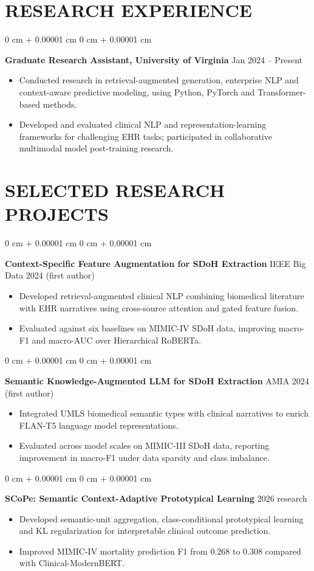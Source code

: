 \documentclass[10pt, letterpaper]{article}
\newenvironment{highlights}{
    \begin{itemize}[
        topsep=0.03 cm,
        parsep=0.03 cm,
        partopsep=0pt,
        itemsep=0pt,
        leftmargin=0 cm + 10pt
    ]
}{
    \end{itemize}
} %
\newenvironment{onecolentry}{
    \begin{adjustwidth}{
        0 cm + 0.00001 cm
    }{
        0 cm + 0.00001 cm
    }
}{
    \end{adjustwidth}
} %
\begin{document}
\section{RESEARCH EXPERIENCE}
\begin{onecolentry}
\textbf{Graduate Research Assistant, University of Virginia} \hfill Jan 2024 -- Present
\begin{highlights}
\item Conducted research in retrieval-augmented generation, enterprise NLP and context-aware predictive modeling, using Python, PyTorch and Transformer-based methods.
\item Developed and evaluated clinical NLP and representation-learning frameworks for challenging EHR tasks; participated in collaborative multimodal model post-training research.
\end{highlights}
\end{onecolentry}
\section{SELECTED RESEARCH PROJECTS}
\begin{onecolentry}
\textbf{Context-Specific Feature Augmentation for SDoH Extraction} \hfill IEEE Big Data 2024 (first author)
\begin{highlights}
\item Developed retrieval-augmented clinical NLP combining biomedical literature with EHR narratives using cross-source attention and gated feature fusion.
\item Evaluated against six baselines on MIMIC-IV SDoH data, improving macro-F1 and macro-AUC over Hierarchical RoBERTa.
\end{highlights}
\end{onecolentry}
\vspace{0.025 cm}
\begin{onecolentry}
\textbf{Semantic Knowledge-Augmented LLM for SDoH Extraction} \hfill AMIA 2024 (first author)
\begin{highlights}
\item Integrated UMLS biomedical semantic types with clinical narratives to enrich FLAN-T5 language model representations.
\item Evaluated across model scales on MIMIC-III SDoH data, reporting improvement in macro-F1 under data sparsity and class imbalance.
\end{highlights}
\end{onecolentry}
\vspace{0.025 cm}
\begin{onecolentry}
\textbf{SCoPe: Semantic Context-Adaptive Prototypical Learning} \hfill 2026 research
\begin{highlights}
\item Developed semantic-unit aggregation, class-conditional prototypical learning and KL regularization for interpretable clinical outcome prediction.
\item Improved MIMIC-IV mortality prediction F1 from 0.268 to 0.308 compared with Clinical-ModernBERT.
\end{highlights}
\end{onecolentry}
\vspace{0.025 cm}
\end{document}
